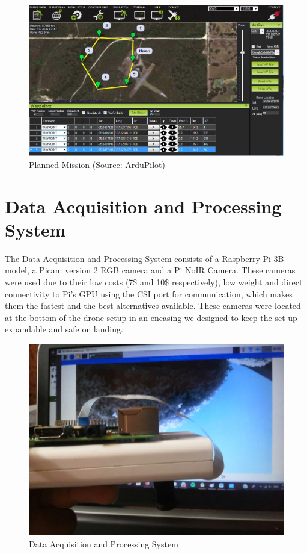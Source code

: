 \begin{figure}[H]
    \centering
    \includegraphics[width=\linewidth]{SummerInterReport/project/Images-Major/mp2.png}
    \caption{Planned Mission (Source: ArduPilot)}
    \label{fig:compEy}
\end{figure}

\section{Data Acquisition and Processing System}
The Data Acquisition and Processing System consists of a Raspberry Pi 3B model, a Picam version 2 RGB camera and a Pi NoIR Camera. These cameras were used due to their low costs (7\$ and 10\$ respectively), low weight and direct connectivity to Pi's GPU using the CSI port for communication, which makes them the fastest and the best alternatives available. These cameras were located at the bottom of the drone setup in an encasing we designed to keep the set-up expandable and safe on landing.
\begin{figure}[H]
    \centering
    \includegraphics[width=0.7\linewidth]{SummerInterReport/project/Images-Major/pi_system.jpeg}
    \caption{Data Acquisition and Processing System}
    \label{fig:compEy}
\end{figure}

